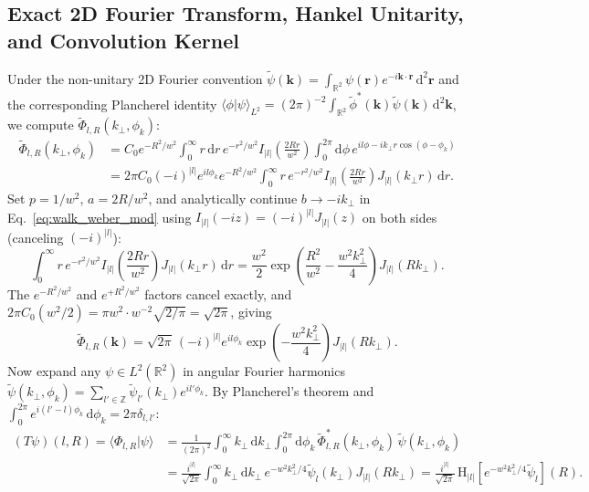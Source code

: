 \documentclass[10pt,letterpaper]{article}
\newcommand{\braket}[2]{\langle #1 | #2 \rangle}
\newcommand{\abs}[1]{\lvert #1 \rvert}
\newcommand{\dd}{\mathrm{d}}
\numberwithin{equation}{section}
\begin{document}
\subsection{Exact 2D Fourier Transform, Hankel Unitarity, and Convolution Kernel}
Under the non-unitary 2D Fourier convention $\widetilde{\psi}(\mathbf{k}) = \int_{\mathbb{R}^2}\psi(\mathbf{r})e^{-i\mathbf{k}\cdot\mathbf{r}}\,\dd^2\mathbf{r}$ and the corresponding Plancherel identity $\braket{\phi}{\psi}_{L^2} = (2\pi)^{-2}\allowbreak\int_{\mathbb{R}^2}\widetilde{\phi}^*(\mathbf{k})\widetilde{\psi}(\mathbf{k})\,\dd^2\mathbf{k}$, we compute $\widetilde{\Phi}_{l,R}(k_\perp,\phi_k)$:
\begin{align}
  \widetilde{\Phi}_{l,R}(k_\perp,\phi_k) &= C_0 e^{-R^2/w^2} \int_0^\infty r\,\dd r\, e^{-r^2/w^2} I_{\abs{l}}\!\left(\frac{2Rr}{w^2}\right) \int_0^{2\pi} \dd\phi\, e^{il\phi - i k_\perp r\cos(\phi-\phi_k)} \nonumber \\
  &= 2\pi C_0 (-i)^{\abs{l}} e^{il\phi_k} e^{-R^2/w^2} \int_0^\infty r\, e^{-r^2/w^2} I_{\abs{l}}\!\left(\frac{2Rr}{w^2}\right) J_{\abs{l}}(k_\perp r)\,\dd r.
\end{align}
Set $p = 1/w^2$, $a = 2R/w^2$, and analytically continue $b \to -i k_\perp$ in Eq.~\eqref{eq:walk_weber_mod} using $I_{\abs{l}}(-i z) = (-i)^{\abs{l}} J_{\abs{l}}(z)$ on both sides (canceling $(-i)^{\abs{l}}$):
\begin{equation}
  \int_0^\infty r\,e^{-r^2/w^2} I_{\abs{l}}\!\left(\frac{2Rr}{w^2}\right) J_{\abs{l}}(k_\perp r)\,\dd r = \frac{w^2}{2}\exp\!\left(\frac{R^2}{w^2} - \frac{w^2 k_\perp^2}{4}\right) J_{\abs{l}}(R k_\perp).
\end{equation}
The $e^{-R^2/w^2}$ and $e^{+R^2/w^2}$ factors cancel exactly, and $2\pi C_0 (w^2/2) = \pi w^2 \cdot w^{-2}\sqrt{2/\pi} = \sqrt{2\pi}$, giving
\begin{equation}
  \widetilde{\Phi}_{l,R}(\mathbf{k}) = \sqrt{2\pi}\,(-i)^{\abs{l}} e^{il\phi_k} \exp\!\left(-\frac{w^2 k_\perp^2}{4}\right) J_{\abs{l}}(R k_\perp).
  \label{eq:walk_ft_phi}
\end{equation}
Now expand any $\psi \in L^2(\mathbb{R}^2)$ in angular Fourier harmonics $\widetilde{\psi}(k_\perp,\phi_k) = \sum_{l'\in\mathbb{Z}} \widetilde{\psi}_{l'}(k_\perp) e^{il'\phi_k}$. By Plancherel's theorem and $\int_0^{2\pi} e^{i(l'-l)\phi_k}\,\dd\phi_k = 2\pi\delta_{l,l'}$:
\begin{align}
  (T\psi)(l,R) = \braket{\Phi_{l,R}}{\psi} &= \frac{1}{(2\pi)^2} \int_0^\infty k_\perp\,\dd k_\perp \int_0^{2\pi} \dd\phi_k\, \widetilde{\Phi}_{l,R}^*(k_\perp,\phi_k)\,\widetilde{\psi}(k_\perp,\phi_k) \nonumber \\
  &= \frac{i^{\abs{l}}}{\sqrt{2\pi}} \int_0^\infty k_\perp\,\dd k_\perp\, e^{-w^2 k_\perp^2/4} \widetilde{\psi}_l(k_\perp) J_{\abs{l}}(R k_\perp) = \frac{i^{\abs{l}}}{\sqrt{2\pi}}\,\mathrm{H}_{\abs{l}}\!\left[e^{-w^2 k_\perp^2/4}\widetilde{\psi}_l\right](R).
\end{align}
\end{document}
